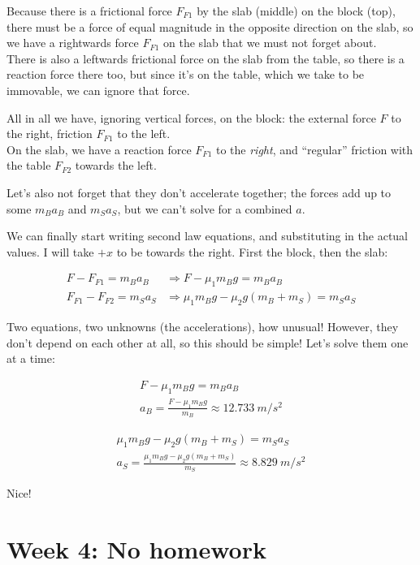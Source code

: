 \documentclass[12pt,a4paper]{report}
\begin{document}
Because there is a frictional force $F_{F1}$ by the slab (middle) on the block (top), there must be a force of equal magnitude in the opposite direction on the slab, so we have a rightwards force $F_{F1}$ on the slab that we must not forget about.\\
There is also a leftwards frictional force on the slab from the table, so there is a reaction force there too, but since it's on the table, which we take to be immovable, we can ignore that force.

All in all we have, ignoring vertical forces, on the block: the external force $F$ to the right, friction $F_{F1}$ to the left.\\
On the slab, we have a reaction force $F_{F1}$ to the \emph{right}, and ``regular'' friction with the table $F_{F2}$ towards the left.

Let's also not forget that they don't accelerate together; the forces add up to some $m_B a_B$ and $m_S a_S$, but we can't solve for a combined $a$.

We can finally start writing second law equations, and substituting in the actual values. I will take $+x$ to be towards the right. First the block, then the slab:

\begin{align}
F - F_{F1} = m_B a_B &\Rightarrow F - \mu_1 m_B g = m_B a_B\\
F_{F1} - F_{F2} = m_S a_S &\Rightarrow \mu_1 m_B g - \mu_2 g(m_B + m_S) = m_S a_S
\end{align}

Two equations, two unknowns (the accelerations), how unusual! However, they don't depend on each other at all, so this should be simple! Let's solve them one at a time:

\begin{align}
F - \mu_1 m_B g = m_B a_B\\
a_B = \frac{F - \mu_1 m_B g}{m_B} \approx \SI{12.733}{m/s^2}
\end{align}

\begin{align}
\mu_1 m_B g - \mu_2 g(m_B + m_S) = m_S a_S\\
a_S = \frac{\mu_1 m_B g - \mu_2 g(m_B + m_S)}{m_S} \approx \SI{8.829}{m/s^2}
\end{align}

Nice!

\chapter{Week 4: No homework}
\end{document}
